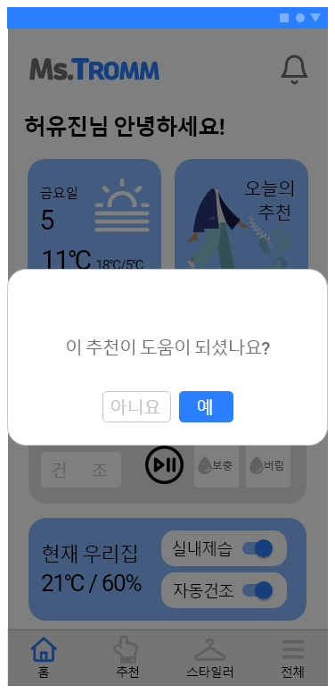 \documentclass[conference]{IEEEtran}
\begin{document}
\begin{enumerate}
{    \includegraphics[scale=0.18]{7-1. 추천알림.jpg}
}
\end{enumerate}
\end{document}
